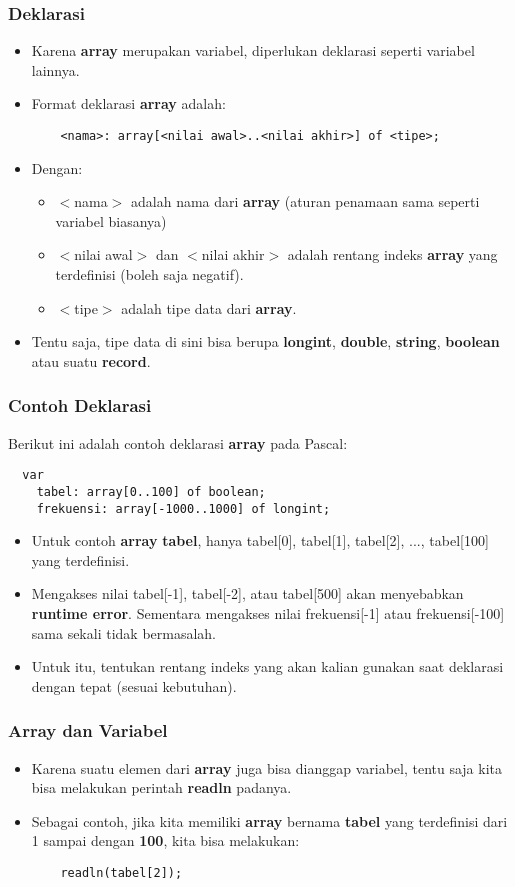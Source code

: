 \begin{frame}[fragile]
\frametitle{Deklarasi}
\begin{itemize}
  \item Karena \textbf{array} merupakan variabel, diperlukan deklarasi seperti variabel lainnya.
  \item Format deklarasi \textbf{array} adalah:
  \begin{lstlisting}
    <nama>: array[<nilai awal>..<nilai akhir>] of <tipe>;
  \end{lstlisting}
  \item Dengan:
  \begin{itemize}
    \item $<$nama$>$ adalah nama dari \textbf{array} (aturan penamaan sama seperti variabel biasanya)
    \item $<$nilai awal$>$ dan $<$nilai akhir$>$ adalah rentang indeks \textbf{array} yang terdefinisi (boleh saja negatif).
    \item $<$tipe$>$ adalah tipe data dari \textbf{array}.
  \end{itemize}
  \item Tentu saja, tipe data di sini bisa berupa \textbf{longint}, \textbf{double}, \textbf{string}, \textbf{boolean} atau suatu \textbf{record}.
\end{itemize}
\end{frame}

\begin{frame}[fragile]
\frametitle{Contoh Deklarasi}
Berikut ini adalah contoh deklarasi \textbf{array} pada Pascal:
\begin{lstlisting}
  var
    tabel: array[0..100] of boolean;
    frekuensi: array[-1000..1000] of longint;
\end{lstlisting}
\begin{itemize}
  \item Untuk contoh \textbf{array} \textbf{tabel}, hanya tabel[0], tabel[1], tabel[2], ..., tabel[100] yang terdefinisi.
  \item Mengakses nilai tabel[-1], tabel[-2], atau tabel[500] akan menyebabkan \textbf{runtime error}. Sementara mengakses nilai frekuensi[-1] atau frekuensi[-100] sama sekali tidak bermasalah.
  \item Untuk itu, tentukan rentang indeks yang akan kalian gunakan saat deklarasi dengan tepat (sesuai kebutuhan).
\end{itemize}
\end{frame}

\begin{frame}[fragile]
\frametitle{Array dan Variabel}
\begin{itemize}
  \item Karena suatu elemen dari \textbf{array} juga bisa dianggap variabel, tentu saja kita bisa melakukan perintah \textbf{readln} padanya.
  \item Sebagai contoh, jika kita memiliki \textbf{array} bernama \textbf{tabel} yang terdefinisi dari 1 sampai dengan \textbf{100}, kita bisa melakukan:
  \begin{lstlisting}
    readln(tabel[2]);
  \end{lstlisting}
\end{itemize}
\end{frame}

